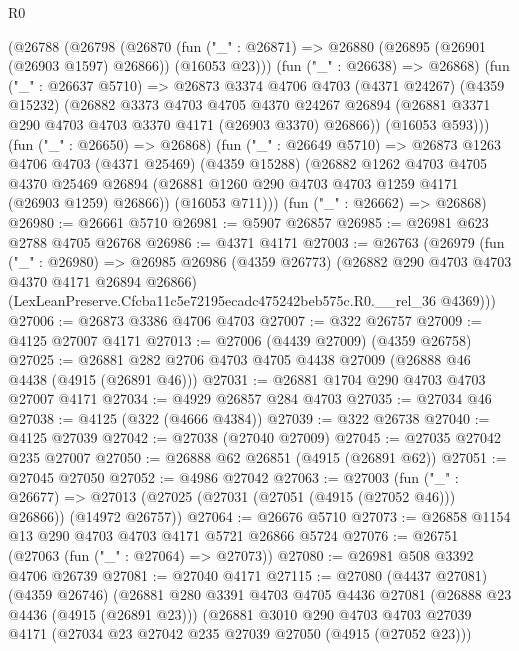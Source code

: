\begin{lexlean}{R0}
\begin{coremodule}
    (@26788
      (@26798
        (@26870 (fun ("_" : @26871) => @26880 (@26895 (@26901 (@26903 @1597) @26866)) (@16053 @23)))
        (fun ("_" : @26638) => @26868)
        (fun ("_" : @26637 @5710) =>
        @26873
          @3374
          @4706
          @4703
          (@4371 @24267)
          (@4359 @15232)
          (@26882
            @3373
            @4703
            @4705
            @4370
            @24267
            @26894
            (@26881 @3371 @290 @4703 @4703 @3370 @4171 (@26903 @3370) @26866))
          (@16053 @593)))
      (fun ("_" : @26650) => @26868)
      (fun ("_" : @26649 @5710) =>
      @26873
        @1263
        @4706
        @4703
        (@4371 @25469)
        (@4359 @15288)
        (@26882
          @1262
          @4703
          @4705
          @4370
          @25469
          @26894
          (@26881 @1260 @290 @4703 @4703 @1259 @4171 (@26903 @1259) @26866))
        (@16053 @711)))
    (fun ("_" : @26662) => @26868)
@26980 := @26661 @5710
@26981 := @5907 @26857
@26985 := @26981 @623 @2788 @4705 @26768
@26986 := @4371 @4171
@27003 := @26763
    (@26979
      (fun ("_" : @26980) =>
      @26985
        @26986
        (@4359 @26773)
        (@26882 @290 @4703 @4703 @4370 @4171 @26894 @26866)
        (LexLeanPreserve.Cfcba11c5e72195ecadc475242beb575c.R0.__rel_36 @4369)))
@27006 := @26873 @3386 @4706 @4703
@27007 := @322 @26757
@27009 := @4125 @27007 @4171
@27013 := @27006 (@4439 @27009) (@4359 @26758)
@27025 := @26881 @282 @2706 @4703 @4705 @4438 @27009 (@26888 @46 @4438 (@4915 (@26891 @46)))
@27031 := @26881 @1704 @290 @4703 @4703 @27007 @4171
@27034 := @4929 @26857 @284 @4703
@27035 := @27034 @46
@27038 := @4125 (@322 (@4666 @4384))
@27039 := @322 @26738
@27040 := @4125 @27039
@27042 := @27038 (@27040 @27009)
@27045 := @27035 @27042 @235 @27007
@27050 := @26888 @62 @26851 (@4915 (@26891 @62))
@27051 := @27045 @27050
@27052 := @4986 @27042
@27063 := @27003
    (fun ("_" : @26677) =>
    @27013 (@27025 (@27031 (@27051 (@4915 (@27052 @46))) @26866)) (@14972 @26757))
@27064 := @26676 @5710
@27073 := @26858 @1154 @13 @290 @4703 @4703 @4171 @5721 @26866 @5724
@27076 := @26751 (@27063 (fun ("_" : @27064) => @27073))
@27080 := @26981 @508 @3392 @4706 @26739
@27081 := @27040 @4171
@27115 := @27080
    (@4437 @27081)
    (@4359 @26746)
    (@26881
      @280
      @3391
      @4703
      @4705
      @4436
      @27081
      (@26888 @23 @4436 (@4915 (@26891 @23)))
      (@26881
        @3010
        @290
        @4703
        @4703
        @27039
        @4171
        (@27034 @23 @27042 @235 @27039 @27050 (@4915 (@27052 @23)))

\end{coremodule}
\end{lexlean}

